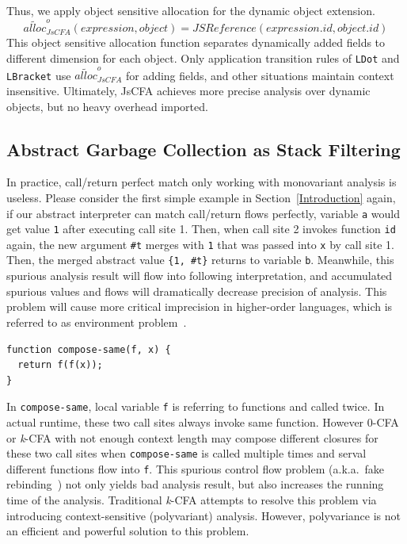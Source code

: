 \documentclass{article}
\begin{document}
Thus, we apply object sensitive allocation for the dynamic object extension.
\[
\widetilde{alloc}^{o}_{JsCFA}(expression, object) = JSReference(expression.id, object.id)
\]
This object sensitive allocation function separates dynamically added fields to different dimension for each object. Only application transition rules of \verb|LDot| and \verb|LBracket| use $\widetilde{alloc}^{o}_{JsCFA}$ for adding fields, and other situations maintain context insensitive.
Ultimately, JsCFA achieves more precise analysis over dynamic objects, but no heavy overhead imported.

\subsection{Abstract Garbage Collection as Stack Filtering}
\label{sub:filtering}
In practice, call/return perfect match only working with monovariant analysis is useless.
Please consider the first simple example in Section~\ref{Introduction} again, if our abstract interpreter can match call/return flows perfectly, variable \verb|a| would get value \verb|1| after executing call site 1. Then, when call site 2 invokes function \verb|id| again, the new argument \verb|#t| merges with \verb|1| that was passed into \verb|x| by call site 1.
Then, the merged abstract value \verb|{1, #t}| returns to variable \verb|b|.
Meanwhile, this spurious analysis result will flow into following interpretation, and accumulated spurious values and flows will dramatically decrease precision of analysis.
This problem will cause more critical imprecision in higher-order languages, which is referred to as environment problem~\cite{shivers1991control}.
\begin{lstlisting}
function compose-same(f, x) {
  return f(f(x));
}
\end{lstlisting}
In \verb|compose-same|, local variable \verb|f| is referring to functions and called twice.
In actual runtime, these two call sites always invoke same function.
However 0-CFA or \textit{k}-CFA with not enough context length may compose different closures for these two call sites when \verb|compose-same| is called multiple times and serval different functions flow into \verb|f|.
This spurious control flow problem (a.k.a.\ fake rebinding~\cite{vardoulakis2010cfa2}) not only yields bad analysis result, but also increases the running time of the analysis.
Traditional \textit{k}-CFA attempts to resolve this problem via introducing context-sensitive (polyvariant) analysis.
However, polyvariance is not an efficient and powerful solution to this problem.
\end{document}
